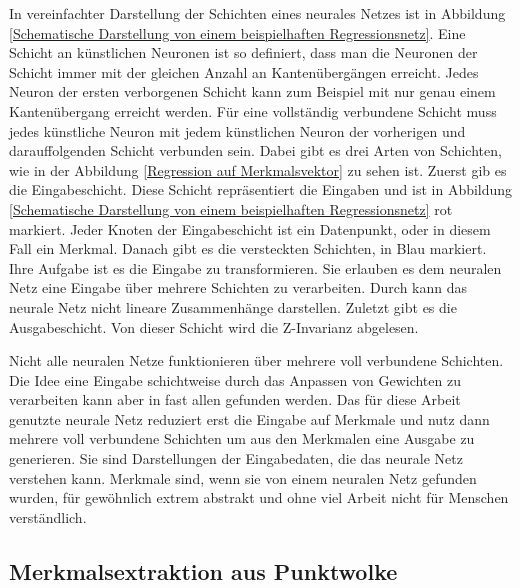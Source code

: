 In vereinfachter Darstellung der Schichten eines neurales Netzes ist in Abbildung \ref{Schematische Darstellung von einem beispielhaften Regressionsnetz}. Eine Schicht an künstlichen Neuronen ist so definiert, 
dass man die Neuronen der Schicht immer mit der gleichen Anzahl an Kantenübergängen erreicht. Jedes Neuron der ersten verborgenen Schicht kann zum Beispiel mit nur genau einem Kantenübergang erreicht werden.
Für eine vollständig verbundene Schicht muss jedes künstliche Neuron mit jedem künstlichen Neuron der vorherigen und darauffolgenden Schicht verbunden sein. Dabei gibt es drei Arten von Schichten, wie in der Abbildung \ref{Regression auf Merkmalsvektor} zu sehen ist. Zuerst gib es die Eingabeschicht.
Diese Schicht repräsentiert die Eingaben und ist in Abbildung \ref{Schematische Darstellung von einem beispielhaften Regressionsnetz} rot markiert. Jeder Knoten der Eingabeschicht ist ein Datenpunkt, oder in diesem Fall ein Merkmal. 
Danach gibt es die versteckten Schichten, in Blau markiert. Ihre Aufgabe ist es die Eingabe zu transformieren. 
Sie erlauben es dem neuralen Netz eine Eingabe über mehrere Schichten zu verarbeiten. Durch kann das neurale Netz nicht lineare Zusammenhänge darstellen. Zuletzt gibt es die Ausgabeschicht. Von dieser Schicht wird die Z-Invarianz abgelesen.

\smallskip

Nicht alle neuralen Netze funktionieren über mehrere voll verbundene Schichten. Die Idee eine Eingabe schichtweise durch das Anpassen von Gewichten zu verarbeiten kann aber in fast allen gefunden werden.
Das für diese Arbeit genutzte neurale Netz reduziert erst die Eingabe auf Merkmale und nutz dann mehrere voll verbundene Schichten um aus den Merkmalen eine Ausgabe zu generieren. Sie sind Darstellungen der Eingabedaten, die das neurale Netz verstehen kann.
Merkmale sind, wenn sie von einem neuralen Netz gefunden wurden, für gewöhnlich extrem abstrakt und ohne viel Arbeit nicht für Menschen verständlich.

\subsection{Merkmalsextraktion aus Punktwolke}
\label{Merkmalsextraktion aus Punktwolke}

